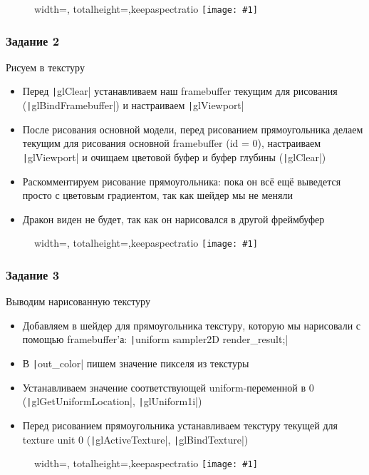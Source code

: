 \documentclass[10pt]{beamer}
\newcommand{\slideimage}[1]{
  \begin{figure}
    \begin{adjustbox}{width=\textwidth, totalheight=\textheight-2\baselineskip-2\baselineskip,keepaspectratio}
      \texttt{[image: \#1]}
    \end{adjustbox}
  \end{figure}
}
\begin{document}
\begin{frame}[fragile]
\slideimage{1.png}
\end{frame}

\begin{frame}[fragile]
\frametitle{Задание 2}
Рисуем в текстуру
\begin{itemize}
\item Перед \texttt|glClear| устанавливаем наш framebuffer текущим для рисования (\texttt|glBindFramebuffer|) и настраиваем \texttt|glViewport|
\item После рисования основной модели, перед рисованием прямоугольника делаем текущим для рисования основной framebuffer (id = 0), настраиваем \texttt|glViewport| и очищаем цветовой буфер и буфер глубины (\texttt|glClear|)
\item Раскомментируем рисование прямоугольника: пока он всё ещё выведется просто с цветовым градиентом, так как шейдер мы не меняли
\item Дракон виден не будет, так как он нарисовался в другой фреймбуфер
\end{itemize}
\end{frame}

\begin{frame}[fragile]
\slideimage{2.png}
\end{frame}

\begin{frame}[fragile]
\frametitle{Задание 3}
Выводим нарисованную текстуру
\begin{itemize}
\item Добавляем в шейдер для прямоугольника текстуру, которую мы нарисовали с помощью framebuffer'а: \texttt|uniform sampler2D render_result;|
\item В \texttt|out_color| пишем значение пикселя из текстуры
\item Устанавливаем значение соответствующей uniform-переменной в 0 (\texttt|glGetUniformLocation|, \texttt|glUniform1i|)
\item Перед рисованием прямоугольника устанавливаем текстуру текущей для texture unit 0 (\texttt|glActiveTexture|, \texttt|glBindTexture|)
\end{itemize}
\end{frame}

\begin{frame}[fragile]
\slideimage{3.png}
\end{frame}
\end{document}
